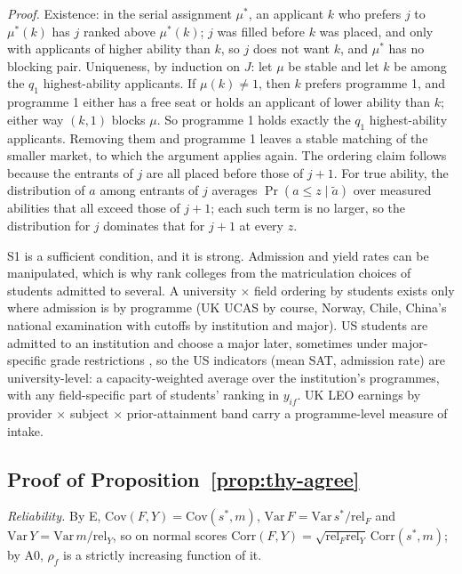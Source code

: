 \emph{Proof.} Existence: in the serial assignment $\mu^*$, an applicant $k$ who prefers $j$ to $\mu^*(k)$ has $j$
ranked above $\mu^*(k)$; $j$ was filled before $k$ was placed, and only with applicants of higher ability than $k$, so
$j$ does not want $k$, and $\mu^*$ has no blocking pair. Uniqueness, by induction on $J$: let $\mu$ be stable and let
$k$ be among the $q_1$ highest-ability applicants. If $\mu(k)\neq1$, then $k$ prefers programme 1, and programme 1
either has a free seat or holds an applicant of lower ability than $k$; either way $(k,1)$ blocks $\mu$. So programme 1
holds exactly the $q_1$ highest-ability applicants. Removing them and programme 1 leaves a stable matching of the
smaller market, to which the argument applies again. The ordering claim follows because the entrants of $j$ are all
placed before those of $j+1$. For true ability, the distribution of $a$ among entrants of $j$ averages
$\Pr(a\le z\mid\tilde a)$ over measured abilities that all exceed those of $j+1$; each such term is no larger, so the
distribution for $j$ dominates that for $j+1$ at every $z$. \thyqed

S1 is a sufficient condition, and it is strong. Admission and yield rates can be manipulated, which is why
\citet{avery2013revealed} rank colleges from the matriculation choices of students admitted to several. A
university $\times$ field ordering by students exists only where admission is by programme (UK UCAS by course,
Norway, Chile, China's national examination with cutoffs by institution and major). US students are admitted to an
institution and choose a major later, sometimes under major-specific grade restrictions \citep{bleemer2022will}, so the
US indicators (mean SAT, admission rate) are university-level: a capacity-weighted average over the institution's
programmes, with any field-specific part of students' ranking in $y_{if}$. UK LEO earnings by provider $\times$
subject $\times$ prior-attainment band carry a programme-level measure of intake.

\subsection{Proof of Proposition~\ref{prop:thy-agree}}\label{app:thy:p1}

\emph{Reliability.} By E, $\mathrm{Cov}(F,Y)=\mathrm{Cov}(s^*,m)$, $\mathrm{Var}\,F=\mathrm{Var}\,s^*/\mathrm{rel}_F$
and $\mathrm{Var}\,Y=\mathrm{Var}\,m/\mathrm{rel}_Y$, so on normal scores
$\mathrm{Corr}(F,Y)=\sqrt{\mathrm{rel}_F\mathrm{rel}_Y}\,\mathrm{Corr}(s^*,m)$; by A0, $\rho_f$ is a strictly
increasing function of it.

